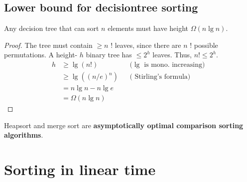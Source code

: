 \documentclass[11pt,toc=twocol]{elegantbook}
\begin{document}
\subsection{Lower bound for decisiontree sorting}
\begin{theorem}
    Any decision tree that can sort $n$ elements must have height $\Omega(n \lg n)$.
\end{theorem}
\begin{proof}
    The tree must contain $\geq n$ ! leaves, since there are $n$ ! possible permutations. A height- $h$ binary tree has $\leq 2^{h}$ leaves. Thus, $n ! \leq 2^{h}$.
    $$
\begin{aligned}
h & \geq \lg (n !) & &(\lg \text { is mono. increasing) }\\
& \geq \lg \left((n / e)^{n}\right) & &(\text { Stirling's formula) }\\
&=n \lg n-n \lg e & \\
&=\Omega(n \lg n)
\end{aligned}
$$
\end{proof}
\begin{corollary}
    Heapsort and merge sort are \textbf{asymptotically optimal comparison sorting algorithms}.
\end{corollary}
\section{Sorting in linear time}
\end{document}
